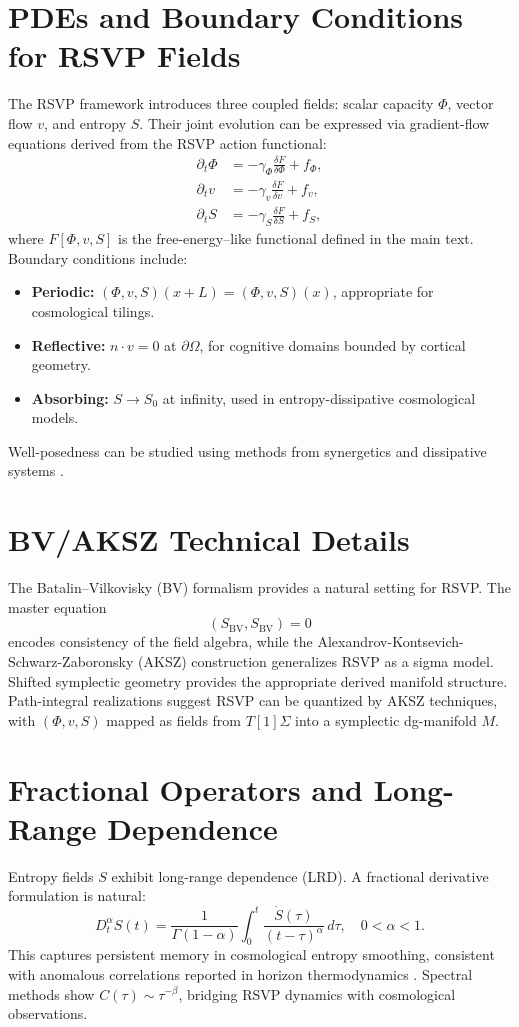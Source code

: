 \appendix

\section{PDEs and Boundary Conditions for RSVP Fields}
The RSVP framework introduces three coupled fields: scalar capacity $\Phi$, vector flow $v$, and entropy $S$. Their joint evolution can be expressed via gradient-flow equations derived from the RSVP action functional:
\begin{align}
\partial_t \Phi &= -\gamma_\Phi \frac{\delta F}{\delta \Phi} + f_\Phi, \\
\partial_t v    &= -\gamma_v \frac{\delta F}{\delta v} + f_v, \\
\partial_t S    &= -\gamma_S \frac{\delta F}{\delta S} + f_S,
\end{align}
where $F[\Phi,v,S]$ is the free-energy–like functional defined in the main text.  
Boundary conditions include:
\begin{itemize}
    \item \textbf{Periodic:} $(\Phi,v,S)(x+L)=(\Phi,v,S)(x)$, appropriate for cosmological tilings.
    \item \textbf{Reflective:} $n\cdot v=0$ at $\partial \Omega$, for cognitive domains bounded by cortical geometry.
    \item \textbf{Absorbing:} $S\to S_0$ at infinity, used in entropy-dissipative cosmological models.
\end{itemize}
Well-posedness can be studied using methods from synergetics \cite{Haken1983} and dissipative systems \cite{Prigogine1980}.

\section{BV/AKSZ Technical Details}
The Batalin–Vilkovisky (BV) formalism \cite{BatalinVilkovisky1981} provides a natural setting for RSVP. The master equation
\[
(S_{\mathrm{BV}},S_{\mathrm{BV}})=0
\]
encodes consistency of the field algebra, while the Alexandrov-Kontsevich-Schwarz-Zaboronsky (AKSZ) construction \cite{Alexandrov:1995kv} generalizes RSVP as a sigma model. Shifted symplectic geometry \cite{Pantev:2011ns} provides the appropriate derived manifold structure. Path-integral realizations \cite{Cattaneo:1999fm} suggest RSVP can be quantized by AKSZ techniques, with $(\Phi,v,S)$ mapped as fields from $T[1]\Sigma$ into a symplectic dg-manifold $M$.

\section{Fractional Operators and Long-Range Dependence}
Entropy fields $S$ exhibit long-range dependence (LRD). A fractional derivative formulation is natural:
\[
D_t^\alpha S(t) = \frac{1}{\Gamma(1-\alpha)}\int_0^t \frac{\dot S(\tau)}{(t-\tau)^\alpha}\,d\tau, \quad 0<\alpha<1.
\]
This captures persistent memory in cosmological entropy smoothing, consistent with anomalous correlations reported in horizon thermodynamics \cite{Barrow:2020unz}. Spectral methods show $C(\tau)\sim \tau^{-\beta}$, bridging RSVP dynamics with cosmological observations.

